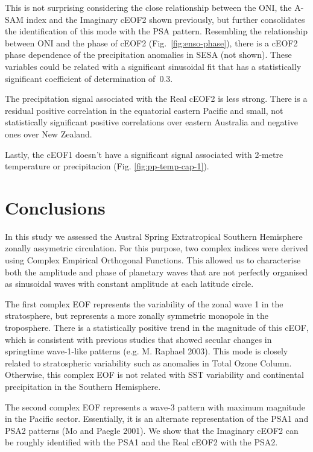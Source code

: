 \documentclass[smallextended]{svjour3}       %
\begin{document}
This is not surprising considering the close relationship between the ONI, the A-SAM index and the Imaginary cEOF2 shown previously, but further consolidates the identification of this mode with the PSA pattern.
Resembling the relationship between ONI and the phase of cEOF2 (Fig.~\ref{fig:enso-phase}), there is a cEOF2 phase dependence of the precipitation anomalies in SESA (not shown).
These variables could be related with a significant sinusoidal fit that has a statistically significant coefficient of determination of~0.3.

The precipitation signal associated with the Real cEOF2 is less strong.
There is a residual positive correlation in the equatorial eastern Pacific and small, not statistically significant positive correlations over eastern Australia and negative ones over New Zealand.

Lastly, the cEOF1 doesn't have a significant signal associated with 2-metre temperature or precipitacion (Fig. \ref{fig:pp-temp-cap-1}).

\hypertarget{conclusions}{%
\section{Conclusions}\label{conclusions}}

In this study we assessed the Austral Spring Extratropical Southern Hemisphere zonally assymetric circulation.
For this purpose, two complex indices were derived using Complex Empirical Orthogonal Functions.
This allowed us to characterise both the amplitude and phase of planetary waves that are not perfectly organised as sinusoidal waves with constant amplitude at each latitude circle.

The first complex EOF represents the variability of the zonal wave 1 in the stratosphere, but represents a more zonally symmetric monopole in the troposphere.
There is a statistically positive trend in the magnitude of this cEOF, which is consistent with previous studies that showed secular changes in springtime wave-1-like patterns (e.g. M. Raphael 2003).
This mode is closely related to stratospheric variability such as anomalies in Total Ozone Column.
Otherwise, this complex EOF is not related with SST variability and continental precipitation in the Southern Hemisphere.

The second complex EOF represents a wave-3 pattern with maximum magnitude in the Pacific sector.
Essentially, it is an alternate representation of the PSA1 and PSA2 patterns (Mo and Paegle 2001).
We show that the Imaginary cEOF2 can be roughly identified with the PSA1 and the Real cEOF2 with the PSA2.
\end{document}
